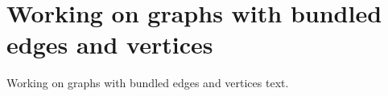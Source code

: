 \chapter{Working on graphs with bundled edges and vertices}

Working on graphs with bundled edges and vertices text.
